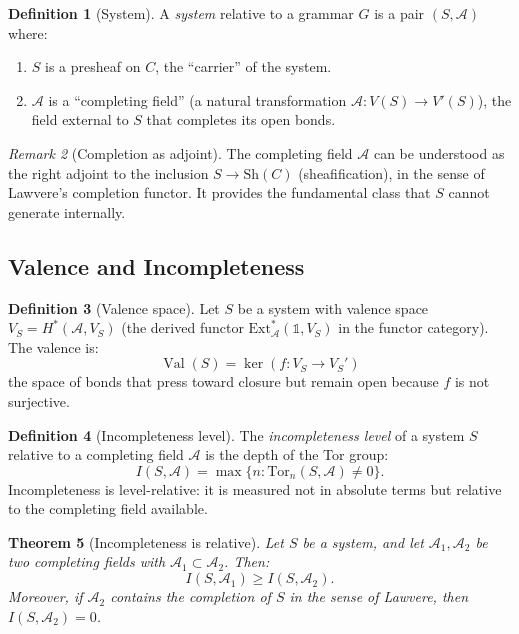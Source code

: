 \documentclass[12pt]{article}
\newtheorem{theorem}{Theorem}[section]
\theoremstyle{definition}
\newtheorem{definition}[theorem]{Definition}
\theoremstyle{remark}
\newtheorem{remark}[theorem]{Remark}
\newcommand{\Ext}{\mathrm{Ext}}
\newcommand{\Tor}{\mathrm{Tor}}
\begin{document}
\begin{definition}[System]
A \emph{system} relative to a grammar $G$ is a pair $(S, \mathcal{A})$ where:
\begin{enumerate}
\item $S$ is a presheaf on $C$, the ``carrier'' of the system.
\item $\mathcal{A}$ is a ``completing field'' (a natural transformation $\mathcal{A} : V(S) \to V'(S)$), the field external to $S$ that completes its open bonds.
\end{enumerate}
\end{definition}

\begin{remark}[Completion as adjoint]
The completing field $\mathcal{A}$ can be understood as the right adjoint to the inclusion $S \to \mathrm{Sh}(C)$ (sheafification), in the sense of Lawvere's completion functor. It provides the fundamental class that $S$ cannot generate internally.
\end{remark}

\subsection{Valence and Incompleteness}

\begin{definition}[Valence space]
Let $S$ be a system with valence space $V_S = H^*(\mathcal{A}, V_S)$ (the derived functor $\Ext^*_{\mathcal{A}}(\mathbb{1}, V_S)$ in the functor category). The valence is:
\[
\operatorname{Val}(S) = \ker(f : V_S \to V_S')
\]
the space of bonds that press toward closure but remain open because $f$ is not surjective.
\end{definition}

\begin{definition}[Incompleteness level]
The \emph{incompleteness level} of a system $S$ relative to a completing field $\mathcal{A}$ is the depth of the Tor group:
\[
I(S, \mathcal{A}) = \max\{n : \Tor_n(S, \mathcal{A}) \neq 0\}.
\]
Incompleteness is level-relative: it is measured not in absolute terms but relative to the completing field available.
\end{definition}

\begin{theorem}[Incompleteness is relative]
\label{thm:incompleteness-relative}
Let $S$ be a system, and let $\mathcal{A}_1, \mathcal{A}_2$ be two completing fields with $\mathcal{A}_1 \subset \mathcal{A}_2$. Then:
\[
I(S, \mathcal{A}_1) \geq I(S, \mathcal{A}_2).
\]
Moreover, if $\mathcal{A}_2$ contains the completion of $S$ in the sense of Lawvere, then $I(S, \mathcal{A}_2) = 0$.
\end{theorem}
\end{document}
